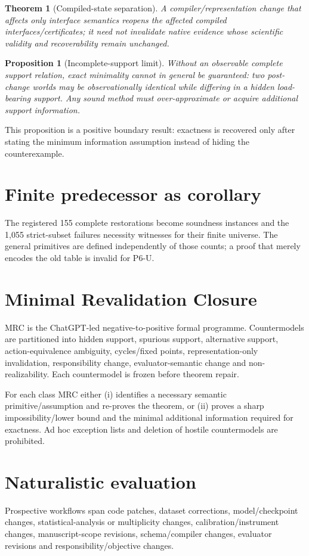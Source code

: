 \documentclass[11pt]{article}
\newtheorem{theorem}{Theorem}
\newtheorem{proposition}{Proposition}
\begin{document}
\begin{theorem}[Compiled-state separation]
A compiler/representation change that affects only interface semantics reopens the affected compiled interfaces/certificates; it need not invalidate native evidence whose scientific validity and recoverability remain unchanged.
\end{theorem}

\begin{proposition}[Incomplete-support limit]
Without an observable complete support relation, exact minimality cannot in general be guaranteed: two post-change worlds may be observationally identical while differing in a hidden load-bearing support. Any sound method must over-approximate or acquire additional support information.
\end{proposition}

This proposition is a positive boundary result: exactness is recovered only after stating the minimum information assumption instead of hiding the counterexample.

\section{Finite predecessor as corollary}
The registered 155 complete restorations become soundness instances and the 1,055 strict-subset failures necessity witnesses for their finite universe. The general primitives are defined independently of those counts; a proof that merely encodes the old table is invalid for P6-U.

\section{Minimal Revalidation Closure}
MRC is the ChatGPT-led negative-to-positive formal programme. Countermodels are partitioned into hidden support, spurious support, alternative support, action-equivalence ambiguity, cycles/fixed points, representation-only invalidation, responsibility change, evaluator-semantic change and non-realizability. Each countermodel is frozen before theorem repair.

For each class MRC either (i) identifies a necessary semantic primitive/assumption and re-proves the theorem, or (ii) proves a sharp impossibility/lower bound and the minimal additional information required for exactness. Ad hoc exception lists and deletion of hostile countermodels are prohibited.

\section{Naturalistic evaluation}
Prospective workflows span code patches, dataset corrections, model/checkpoint changes, statistical-analysis or multiplicity changes, calibration/instrument changes, manuscript-scope revisions, schema/compiler changes, evaluator revisions and responsibility/objective changes.
\end{document}
